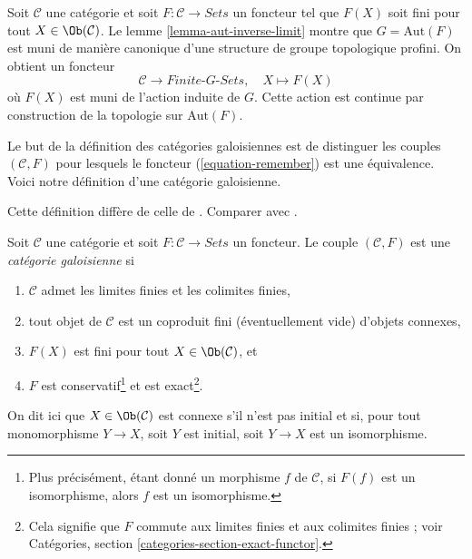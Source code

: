 \begin{example}
\label{example-from-C-F-to-G-sets}
Soit $\mathcal{C}$ une catégorie et soit
$F : \mathcal{C} \to \textit{Sets}$ un foncteur tel que $F(X)$ soit fini
pour tout $X \in \Ob(\mathcal{C})$. Le lemme
\ref{lemma-aut-inverse-limit} montre que $G = \text{Aut}(F)$ est muni de
manière canonique d'une structure de groupe topologique profini. On obtient
un foncteur
\begin{equation}
\label{equation-remember}
\mathcal{C} \longrightarrow \textit{Finite-}G\textit{-Sets},\quad
X \longmapsto F(X)
\end{equation}
où $F(X)$ est muni de l'action induite de $G$. Cette action est continue par
construction de la topologie sur $\text{Aut}(F)$.
\end{example}

\noindent
Le but de la définition des catégories galoisiennes est de distinguer les
couples $(\mathcal{C}, F)$ pour lesquels le foncteur (\ref{equation-remember})
est une équivalence. Voici notre définition d'une catégorie galoisienne.

\begin{definition}
\label{definition-galois-category}
\begin{reference}
Cette définition diffère de celle de \cite[Expos\'e V, Définition 5.1]{SGA1}.
Comparer avec \cite[Définition 7.2.1]{BS}.
\end{reference}
Soit $\mathcal{C}$ une catégorie et soit $F : \mathcal{C} \to \textit{Sets}$
un foncteur. Le couple $(\mathcal{C}, F)$ est une {\it catégorie galoisienne} si
\begin{enumerate}
\item $\mathcal{C}$ admet les limites finies et les colimites finies,
\item
\label{item-connected-components}
tout objet de $\mathcal{C}$ est un coproduit fini (éventuellement vide)
d'objets connexes,
\item $F(X)$ est fini pour tout $X \in \Ob(\mathcal{C})$, et
\item $F$ est conservatif\footnote{Plus précisément, étant donné un morphisme
$f$ de $\mathcal{C}$, si $F(f)$ est un isomorphisme, alors
$f$ est un isomorphisme.} et est exact\footnote{Cela signifie que
$F$ commute aux limites finies et aux colimites finies ; voir
Catégories, section \ref{categories-section-exact-functor}.}.
\end{enumerate}
On dit ici que $X \in \Ob(\mathcal{C})$ est connexe s'il
n'est pas initial et si, pour tout monomorphisme $Y \to X$,
soit $Y$ est initial, soit $Y \to X$ est un isomorphisme.
\end{definition}

